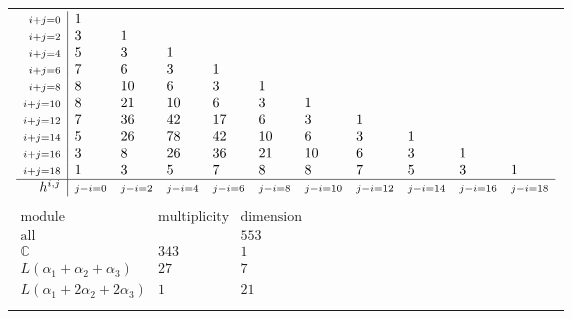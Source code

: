 \documentclass[crop,border=2mm]{standalone}
\begin{document}
\begin{tabular}{l}
$\displaystyle
\begin{array}{r|l l l l l l l l l l}
	{\scriptstyle i+j=0}&1&&&&&&&&&\\
	{\scriptstyle i+j=2}&3&1&&&&&&&&\\
	{\scriptstyle i+j=4}&5&3&1&&&&&&&\\
	{\scriptstyle i+j=6}&7&6&3&1&&&&&&\\
	{\scriptstyle i+j=8}&8&10&6&3&1&&&&&\\
	{\scriptstyle i+j=10}&8&21&10&6&3&1&&&&\\
	{\scriptstyle i+j=12}&7&36&42&17&6&3&1&&&\\
	{\scriptstyle i+j=14}&5&26&78&42&10&6&3&1&&\\
	{\scriptstyle i+j=16}&3&8&26&36&21&10&6&3&1&\\
	{\scriptstyle i+j=18}&1&3&5&7&8&8&7&5&3&1\\
	\hline h^{i,j}&{\scriptstyle j-i=0}&{\scriptstyle j-i=2}&{\scriptstyle j-i=4}&{\scriptstyle j-i=6}&{\scriptstyle j-i=8}&{\scriptstyle j-i=10}&{\scriptstyle j-i=12}&{\scriptstyle j-i=14}&{\scriptstyle j-i=16}&{\scriptstyle j-i=18}
\end{array}
$ \\ \\


$\displaystyle
\begin{array}{rll}
	\text{module}&\text{multiplicity}&\text{dimension} \\ \hline \text{all}&&553 \\
	\mathbb{C}&343&1\\
	L\left(\alpha_{1}+\alpha_{2}+\alpha_{3}\right)&27&7\\
	L\left(\alpha_{1}+ 2\alpha_{2}+ 2\alpha_{3}\right)&1&21
\end{array}
$ \\ \\

\end{tabular}
\end{document}
